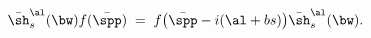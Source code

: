 \begin{equation}\label{shift'}
\bar{\sh}_s^{\al}(\bw)f(\bar{\spp})\;=\;f\big(\bar{\spp}-i(\al+bs)\big)
\bar{\sh}_s^{\al}(\bw).
\end{equation}

